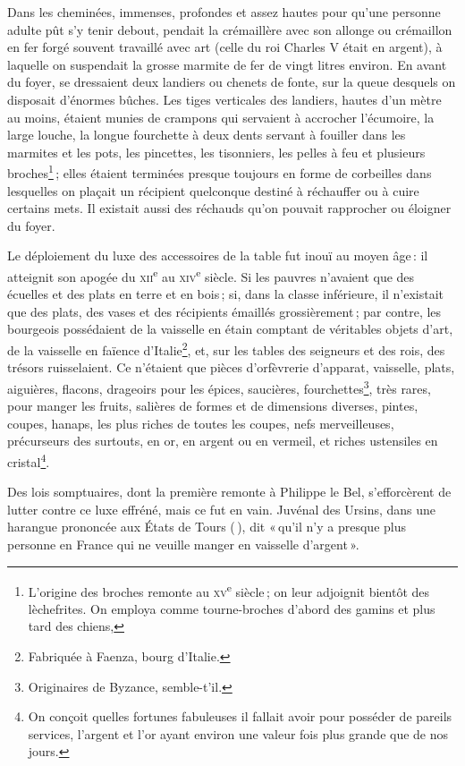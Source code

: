 Dans les cheminées, immenses, profondes et assez hautes pour qu'une personne
adulte pût s'y tenir debout, pendait la crémaillère avec son allonge ou
crémaillon en fer forgé souvent travaillé avec art (celle du roi Charles
V était en argent), à laquelle on suspendait la grosse marmite de fer de vingt
litres environ. En avant du foyer, se dressaient deux landiers ou chenets de
fonte, sur la queue desquels on disposait d'énormes bûches. Les tiges
verticales des landiers, hautes d'un mètre au moins, étaient munies de crampons
qui servaient à accrocher l'écumoire, la large louche, la longue fourchette
à deux dents servant à fouiller dans les marmites et les pots, les pincettes,
les tisonniers, les pelles à feu et plusieurs broches\footnote{L'origine des
broches remonte au \textsc{xv}\textsuperscript{e} siècle ; on leur adjoignit
bientôt des lèchefrites. On employa comme tourne-broches d'abord des gamins et
plus tard des chiens,} ; elles étaient terminées presque toujours en forme de
corbeilles dans lesquelles on plaçait un récipient quelconque destiné
à réchauffer ou à cuire certains mets. Il existait aussi des réchauds qu'on
pouvait rapprocher ou éloigner du foyer.

Le déploiement du luxe des accessoires de la table fut inouï au moyen âge : il
atteignit son apogée du \textsc{xii}\textsuperscript{e} au
\textsc{xiv}\textsuperscript{e} siècle. Si les pauvres n'avaient que des
écuelles et des plats en terre et en bois ; si, dans la classe inférieure, il
n'existait que des plats, des vases et des récipients émaillés grossièrement ;
par contre, les bourgeois possédaient de la vaisselle en étain comptant de
véritables objets d'art, de la vaisselle en faïence d'Italie\footnote{Fabriquée
à Faenza, bourg d'Italie.}, et, sur les tables des seigneurs et des rois, des
trésors ruisselaient. Ce n'étaient que pièces d'orfèvrerie d'apparat,
vaisselle, plats, aiguières, flacons, drageoirs pour les épices, saucières,
fourchettes\footnote{Originaires de Byzance, semble-t'il.}, très rares, pour
manger les fruits, salières de formes et de dimensions diverses, pintes,
coupes, hanaps, les plus riches de toutes les coupes, nefs merveilleuses,
précurseurs des surtouts, en or, en argent ou en vermeil, et riches ustensiles
en cristal\footnote{On conçoit quelles fortunes fabuleuses il fallait avoir
pour posséder de pareils services, l'argent et l'or ayant environ une valeur
{\mmm} fois plus grande que de nos jours.}.

Des lois somptuaires, dont la première remonte à Philippe le Bel, s'efforcèrent
de lutter contre ce luxe effréné, mais ce fut en vain. Juvénal des Ursins, dans
une harangue prononcée aux États de Tours ({\mmm} {\mmm}), dit
« qu'il n'y a presque plus personne en France qui ne veuille manger en
vaisselle d'argent ».

